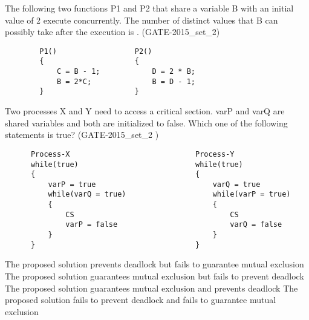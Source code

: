 \vspace{0.08in}


\begin{minipage}{\linewidth}

  \question  The following two functions P1 and P2 that share a variable B with an initial
   value of 2 execute concurrently. The number of distinct values that B can possibly
   take after the execution is \fillin[]. (GATE-2015\_set\_2)

  \begin{lstlisting}
        P1()                  P2()
        {                     {
            C = B - 1;            D = 2 * B;
            B = 2*C;              B = D - 1;
        }                     }
  \end{lstlisting}

  \end{minipage}

\vspace{0.08in}


\begin{minipage}{\linewidth}

  \question  Two processes X and Y need to access a critical section. varP and varQ are shared variables and both are initialized to false. Which one of the following statements is true? (GATE-2015\_set\_2 )

  \begin{lstlisting}
      Process-X                             Process-Y
      while(true)                           while(true)
      {                                     {
          varP = true                           varQ = true
          while(varQ = true)                    while(varP = true)
          {                                     {
              CS                                    CS
              varP = false                          varQ = false
          }                                     }
      }                                     }
  \end{lstlisting}

  \begin{choices}
    \choice The proposed solution prevents deadlock but fails to guarantee mutual exclusion
    \choice The proposed solution guarantees mutual exclusion but fails to prevent deadlock
    \choice The proposed solution guarantees mutual exclusion and prevents deadlock
    \choice The proposed solution fails to prevent deadlock and fails to guarantee mutual exclusion
  \end{choices}

  \end{minipage}

